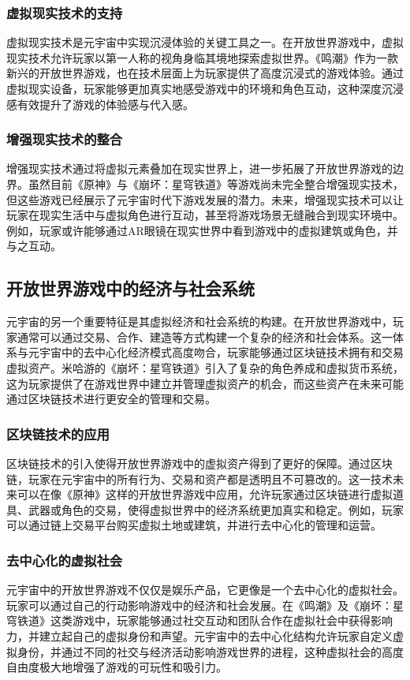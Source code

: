 \documentclass[UTF8]{ctexart}
\begin{document}
	\subsubsection{虚拟现实技术的支持}
	虚拟现实技术是元宇宙中实现沉浸体验的关键工具之一。在开放世界游戏中，虚拟现实技术允许玩家以第一人称的视角身临其境地探索虚拟世界\cite{boellstorff2021coming}。《鸣潮》作为一款新兴的开放世界游戏，也在技术层面上为玩家提供了高度沉浸式的游戏体验。通过虚拟现实设备，玩家能够更加真实地感受游戏中的环境和角色互动，这种深度沉浸感有效提升了游戏的体验感与代入感。
	
	\subsubsection{增强现实技术的整合}
	增强现实技术通过将虚拟元素叠加在现实世界上，进一步拓展了开放世界游戏的边界\cite{zhang2021blockchain}。虽然目前《原神》与《崩坏：星穹铁道》等游戏尚未完全整合增强现实技术，但这些游戏已经展示了元宇宙时代下游戏发展的潜力。未来，增强现实技术可以让玩家在现实生活中与虚拟角色进行互动，甚至将游戏场景无缝融合到现实环境中。例如，玩家或许能够通过AR眼镜在现实世界中看到游戏中的虚拟建筑或角色，并与之互动。
	
	\subsection{开放世界游戏中的经济与社会系统}
	元宇宙的另一个重要特征是其虚拟经济和社会系统的构建。在开放世界游戏中，玩家通常可以通过交易、合作、建造等方式构建一个复杂的经济和社会体系\cite{park2021metaverse}。这一体系与元宇宙中的去中心化经济模式高度吻合，玩家能够通过区块链技术拥有和交易虚拟资产。米哈游的《崩坏：星穹铁道》引入了复杂的角色养成和虚拟货币系统，这为玩家提供了在游戏世界中建立并管理虚拟资产的机会，而这些资产在未来可能通过区块链技术进行更安全的管理和交易。
	
	\subsubsection{区块链技术的应用}
	区块链技术的引入使得开放世界游戏中的虚拟资产得到了更好的保障。通过区块链，玩家在元宇宙中的所有行为、交易和资产都是透明且不可篡改的\cite{grigore2021vrgames}。这一技术未来可以在像《原神》这样的开放世界游戏中应用，允许玩家通过区块链进行虚拟道具、武器或角色的交易，使得虚拟世界中的经济系统更加真实和稳定。例如，玩家可以通过链上交易平台购买虚拟土地或建筑，并进行去中心化的管理和运营。
	
	\subsubsection{去中心化的虚拟社会}
	元宇宙中的开放世界游戏不仅仅是娱乐产品，它更像是一个去中心化的虚拟社会。玩家可以通过自己的行动影响游戏中的经济和社会发展。在《鸣潮》及《崩坏：星穹铁道》这类游戏中，玩家能够通过社交互动和团队合作在虚拟社会中获得影响力，并建立起自己的虚拟身份和声望。元宇宙中的去中心化结构允许玩家自定义虚拟身份，并通过不同的社交与经济活动影响游戏世界的进程，这种虚拟社会的高度自由度极大地增强了游戏的可玩性和吸引力。
	
\end{document}
